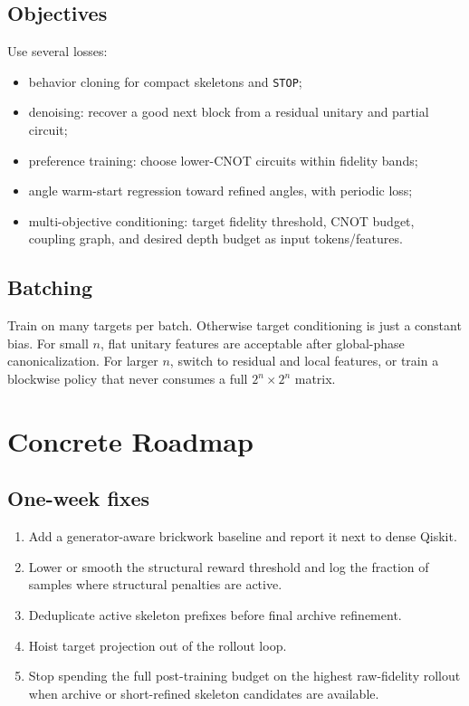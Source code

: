 \documentclass[11pt]{article}
\begin{document}
\subsection{Objectives}

Use several losses:
\begin{itemize}
  \item behavior cloning for compact skeletons and \texttt{STOP};
  \item denoising: recover a good next block from a residual unitary and partial
  circuit;
  \item preference training: choose lower-CNOT circuits within fidelity bands;
  \item angle warm-start regression toward refined angles, with periodic loss;
  \item multi-objective conditioning: target fidelity threshold, CNOT budget,
  coupling graph, and desired depth budget as input tokens/features.
\end{itemize}

\subsection{Batching}

Train on many targets per batch.  Otherwise target conditioning is just a
constant bias.  For small \(n\), flat unitary features are acceptable after
global-phase canonicalization.  For larger \(n\), switch to residual and local
features, or train a blockwise policy that never consumes a full \(2^n \times
2^n\) matrix.

\section{Concrete Roadmap}

\subsection{One-week fixes}

\begin{enumerate}
  \item Add a generator-aware brickwork baseline and report it next to dense
  Qiskit.
  \item Lower or smooth the structural reward threshold and log the fraction of
  samples where structural penalties are active.
  \item Deduplicate active skeleton prefixes before final archive refinement.
  \item Hoist target projection out of the rollout loop.
  \item Stop spending the full post-training budget on the highest raw-fidelity
  rollout when archive or short-refined skeleton candidates are available.
\end{enumerate}
\end{document}
